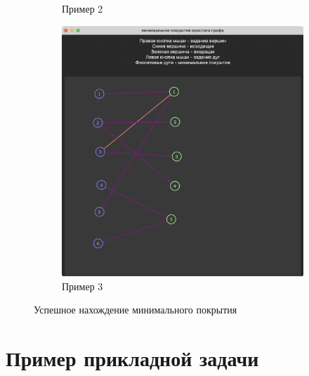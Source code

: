 \documentclass[12pt]{article}
\begin{document}
\begin{figure}[H]
\begin{subfigure}{0.3\textwidth}
        \caption{Пример 2}
        \label{fig:success_example_2}
    \end{subfigure}
    \begin{subfigure}{0.3\textwidth}
        \includegraphics[width=1\textwidth]{screenshot4.png}
        \caption{Пример 3}
        \label{fig:success_example_3}
    \end{subfigure}
    \caption{Успешное нахождение минимального покрытия}
    \label{fig:success_example}
\end{figure}


\section{Пример прикладной задачи}
\end{document}
